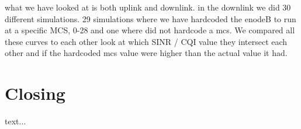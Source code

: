\documentclass[cropmarks, frame, english]{idamasterthesis}
\begin{document}
what we have looked at is both uplink and downlink. in the downlink we did 30 different simulations. 29 simulations where we have hardcoded the enodeB to run at a specific MCS, 0-28 and one where did not hardcode a mcs. We compared all these curves to each other look at which SINR / CQI value they intersect each other and if the hardcoded mcs value were higher than the actual value it had.

\chapter{Closing}

text...
\end{document}
